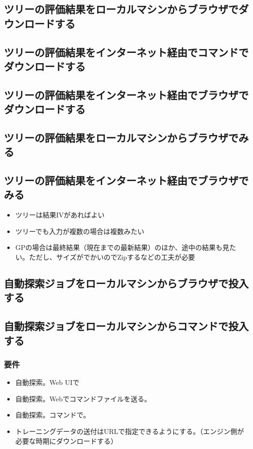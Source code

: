 \documentclass{jsbook}
\begin{document}
\subsection{ツリーの評価結果をローカルマシンからブラウザでダウンロードする}

\subsection{ツリーの評価結果をインターネット経由でコマンドでダウンロードする}


\subsection{ツリーの評価結果をインターネット経由でブラウザでダウンロードする}


\subsection{ツリーの評価結果をローカルマシンからブラウザでみる}

\subsection{ツリーの評価結果をインターネット経由でブラウザでみる}

\begin{itemize}
	\item ツリーは結果IVがあればよい
	\item ツリーでも入力が複数の場合は複数みたい
	\item GPの場合は最終結果（現在までの最新結果）のほか、途中の結果も見たい。ただし、サイズがでかいのでZipするなどの工夫が必要
\end{itemize}

\subsection{自動探索ジョブをローカルマシンからブラウザで投入する}

\subsection{自動探索ジョブをローカルマシンからコマンドで投入する}

\subsubsection{要件}
\begin{itemize}
	\item 自動探索。Web UIで
	\item 自動探索。Webでコマンドファイルを送る。
	\item 自動探索。コマンドで。
	\item トレーニングデータの送付はURLで指定できるようにする。（エンジン側が必要な時期にダウンロードする）
\end{itemize}
	
\end{document}
